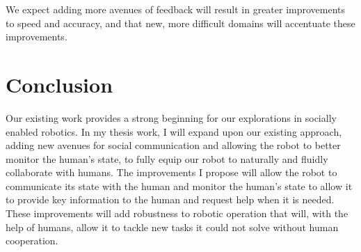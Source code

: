 \documentclass{article}
\begin{document}
We expect adding more avenues of feedback will result in greater improvements to speed and accuracy, and that new, more difficult domains will accentuate these improvements. 

\section{Conclusion}

Our existing work provides a strong beginning for our explorations in socially enabled robotics. In my thesis work, I will expand upon our existing approach, adding new avenues for social communication and allowing the robot to better monitor the human's state, to fully equip our robot to naturally and fluidly collaborate with humans. The improvements I propose will allow the robot to communicate its state with the human and monitor the human's state to allow it to provide key information to the human and request help when it is needed. These improvements will add robustness to robotic operation that will, with the help of humans, allow it to tackle new tasks it could not solve without human cooperation. 


\end{document}

